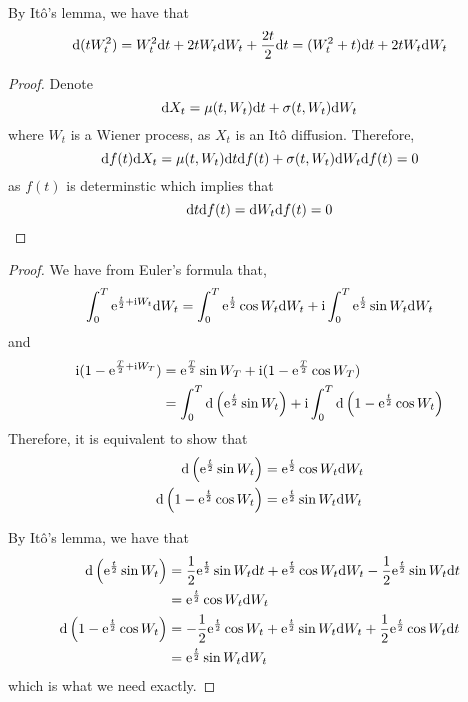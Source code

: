 \documentclass{homework}
\begin{document}
    \problem
    By It\^o's lemma, we have that
    \[\mathrm d (tW_t^2)=W_t^2\mathrm d t+2tW_t\mathrm d W_t+\frac{2t}{2}\mathrm d t
    =(W_t^2+t)\mathrm d t+2tW_t\mathrm d W_t\]

    \problem
    \begin{proof}
        Denote
        \[\mathrm d X_t=\mu(t,W_t)\mathrm d t+\sigma(t,W_t)\mathrm d W_t\]
        where $W_t$ is a Wiener process, as $X_t$ is an It\^o diffusion.
        Therefore,
        \[\mathrm d f(t)\mathrm d X_t=\mu(t,W_t)\mathrm d t\mathrm d f(t)
        +\sigma(t,W_t)\mathrm d W_t\mathrm d f(t)=0\]
        as $f(t)$ is determinstic which implies that
        \[\mathrm d t\mathrm d f(t)=\mathrm d W_t\mathrm d f(t)=0\]
    \end{proof}

    \problem
    \newcommand{\img}{\mathrm i}
    \begin{proof}
        We have from Euler's formula that,
        \[\begin{aligned}
            \int_0^T\e^{\frac{t}{2}+\img W_t}\diff W_t
            =\int_0^T\e^{\frac{t}{2}}\cos W_t\diff W_t
            +\img\int_0^T\e^{\frac{t}{2}}\sin W_t\diff W_t
        \end{aligned}\]
        and
        \[\begin{aligned}
            \img(1-\e^{\frac{T}{2}+\img W_T})
        &=\e^{\frac{T}{2}}\sin W_T+\img(1-\e^{\frac{T}{2}}\cos W_T)\\
        &=\int_0^T\diff\left(\e^{\frac{t}{2}}\sin W_t\right)
        +\img\int_0^T\diff\left(1-\e^{\frac{t}{2}}\cos W_t\right)
        \end{aligned}\]
        Therefore, it is equivalent to show that
        \[\begin{aligned}
            \mathrm d\left(\mathrm e^{\frac{t}{2}}\sin W_t\right)
            &=\mathrm e^{\frac{t}{2}}\cos W_t\mathrm d W_t\\
            \mathrm d\left(1-\mathrm e^{\frac{t}{2}}\cos W_t\right)
            &=\mathrm e^{\frac{t}{2}}\sin W_t\mathrm d W_t
        \end{aligned}\]

        By It\^o's lemma, we have that
        \[\begin{aligned}
            \mathrm d\left(\mathrm e^{\frac{t}{2}}\sin W_t\right)
            &=\frac{1}{2}\mathrm e^{\frac{t}{2}}\sin W_t\mathrm d t
            +\mathrm e^{\frac{t}{2}}\cos W_t\mathrm d W_t
            -\frac{1}{2}\mathrm e^{\frac{t}{2}}\sin W_t\mathrm d t\\
            &=\mathrm e^{\frac{t}{2}}\cos W_t\mathrm d W_t\\
            \mathrm d\left(1-\mathrm e^{\frac{t}{2}}\cos W_t\right)
            &=-\frac{1}{2}\mathrm e^{\frac{t}{2}}\cos W_t
            +\mathrm e^{\frac{t}{2}}\sin W_t\mathrm d W_t
            +\frac{1}{2}\mathrm e^{\frac{t}{2}}\cos W_t\mathrm d t\\
            &=\mathrm e^{\frac{t}{2}}\sin W_t\mathrm d W_t
        \end{aligned}\]
        which is what we need exactly.
    \end{proof}
\end{document}
